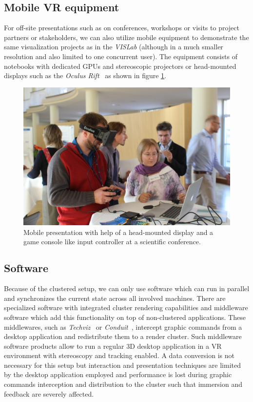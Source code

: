 \documentclass[twocolumn]{svjour3}          %
\begin{document}
\subsection{Mobile VR equipment}
\label{mobile-vr-equipment}

For off-site presentations such as on conferences, workshops or visits to project partners or stakeholders, we can also utilize mobile equipment to demonstrate the same visualization projects as in the \emph{VISLab} (although in a much smaller resolution and also limited to one concurrent user). The equipment consists of notebooks with dedicated GPUs and stereoscopic projectors or head-mounted displays such as the \emph{Oculus Rift}~\cite{web:rift} as shown in figure \ref{fig:rift}.

\begin{figure}[htb]
  \includegraphics[width=\linewidth]{images/rift.jpg}
\caption{Mobile presentation with help of a head-mounted display and a game console like input controller at a scientific conference.}
\label{fig:rift}
\end{figure}

\subsection{Software}
\label{software}

Because of the clustered setup, we can only use software which can run in parallel and synchronizes the current state across all involved machines. There are specialized software with integrated cluster rendering capabilities and middleware software which add this functionality on top of non-clustered applications. These middlewares, such as \emph{Techviz}~\cite{web:techviz} or \emph{Conduit}~\cite{web:conduit}, intercept graphic commands from a desktop application and redistribute them to a render cluster. Such middleware software products allow to run a regular 3D desktop application in a VR environment with stereoscopy and tracking enabled. A data conversion is not necessary for this setup but interaction and presentation techniques are limited by the desktop application employed and performance is lost during graphic commands interception and distribution to the cluster such that immersion and feedback are severely affected.
\end{document}
